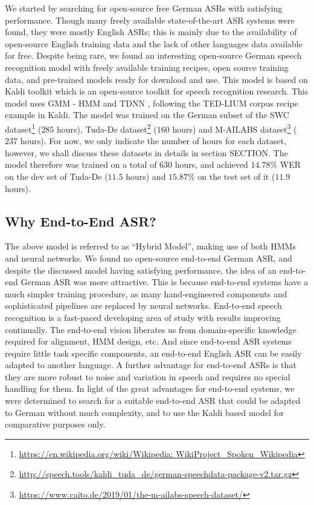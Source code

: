 We started by searching for open-source free German \ac{ASR}s with satisfying performance. Though many freely available state-of-the-art \ac{ASR} systems were found, they were mostly English \ac{ASR}s; this is mainly due to the availability of open-source English training data and the lack of other languages data available for free. Despite being rare, we found an interesting open-source German speech recognition model \cite{milde2018open} with freely available training recipes, open source training data, and pre-trained models ready for download and use. This model is based on Kaldi toolkit \cite{daniel2011kaldi} which is an open-source toolkit for speech recognition research. This model \cite{milde2018open} uses \ac{GMM} - \acf{HMM} and \ac{TDNN} \cite{waibel1990readings} \cite{peddinti2015time}, following the TED-LIUM corpus recipe example \cite{rousseau2014enhancing} in Kaldi. The model \cite{milde2018open} was trained on the German subset of the \ac{SWC} dataset\footnote{\url{https://en.wikipedia.org/wiki/Wikipedia: WikiProject_Spoken_Wikipedia}} ($285$ hours), Tuda-De dataset\footnote{\url{http://speech.tools/kaldi_tuda_de/german-speechdata-package-v2.tar.gz}} \cite{radeck2015open} ($160$ hours) and M-AILABS dataset\footnote{\url{https://www.caito.de/2019/01/the-m-ailabs-speech-dataset/}} ($237$ hours). For now, we only indicate the number of hours for each dataset, however, we shall discuss these datasets in details in section SECTION. The model therefore was trained on a total of $630$ hours, and achieved $14.78\%$ \ac{WER} on the dev set of Tuda-De ($11.5$ hours) and $15.87\%$ on the test set of it ($11.9$ hours).

\subsection{Why End-to-End ASR?}
\label{meth:s2_sub2}

The above model \cite{milde2018open} is referred to as \enquote{Hybrid Model}, making use of both \ac{HMM}s and neural networks. We found no open-source end-to-end German \ac{ASR}, and despite the discussed model \cite{milde2018open} having satisfying performance, the idea of an end-to-end German \ac{ASR} was more attractive. This is because end-to-end systems have a much simpler training procedure, as many hand-engineered components and sophisticated pipelines are replaced by neural networks. End-to-end speech recognition is a fast-paced developing area of study with results improving continually. The end-to-end vision liberates us from domain-specific knowledge required for alignment, \ac{HMM} design, etc. And since end-to-end \ac{ASR} systems require little task specific components, an end-to-end English \ac{ASR} can be easily adapted to another language. A further advantage for end-to-end \ac{ASR}s is that they are more robust to noise and variation in speech and requires no special handling for them. In light of the great advantages for end-to-end systems, we were determined to search for a suitable end-to-end \ac{ASR} that could be adapted to German without much complexity, and to use the Kaldi based model \cite{milde2018open} for comparative purposes only.

